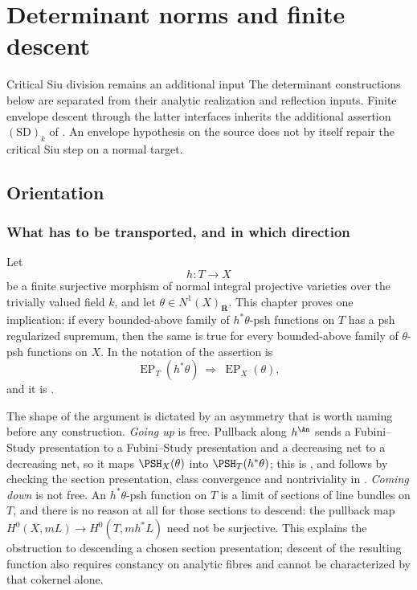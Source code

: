 \chapter{Determinant norms and finite descent}
\label{chap:bj-finite-descent}

\begin{warning}{Critical Siu division remains an additional input}
\label{warn:ch41-siu-dependency}
The determinant constructions below are separated from their analytic
realization and reflection inputs. Finite envelope descent through the
latter interfaces inherits the additional assertion $\mathrm{(SD)}_k$
of . An envelope hypothesis on the source
does not by itself repair the critical Siu step on a normal target.
\end{warning}

\section{Orientation}
\label{sec:ch41-orientation}

\subsection{What has to be transported, and in which direction}
\label{sec:ch41-what}

Let
\[
                         h:T\longrightarrow X
\]
be a finite surjective morphism of normal integral projective varieties over
the trivially valued field $k$, and let
$\theta\in N^1(X)_{\mathbf R}$.  This chapter proves one implication:
if every bounded-above family of $h^*\theta$-psh functions on $T$ has a
psh regularized supremum, then the same is true for every bounded-above
family of $\theta$-psh functions on $X$.  In the notation of
 the assertion is
\[
 \operatorname{EP}_T(h^*\theta)
 \ \Longrightarrow\
 \operatorname{EP}_X(\theta),
\]
and it is .

The shape of the argument is dictated by an asymmetry that is worth naming
before any construction.  \emph{Going up} is free.  Pullback along
$h^{\An}$ sends a Fubini--Study presentation to a Fubini--Study
presentation and a decreasing net to a decreasing net, so it maps
$\PSH_X(\theta)$ into $\PSH_T(h^*\theta)$; this is
, and follows by checking the section presentation, class convergence and
nontriviality in
.  \emph{Coming down} is not free.  An
$h^*\theta$-psh function on $T$ is a limit of sections of line bundles
on $T$, and there is no reason at all for those sections to descend: the
pullback map $H^0(X,mL)\to H^0(T,mh^*L)$ need not be surjective.
This explains the obstruction to descending a chosen section
presentation; descent of the resulting function also requires constancy
on analytic fibres and cannot be characterized by that cokernel alone.

